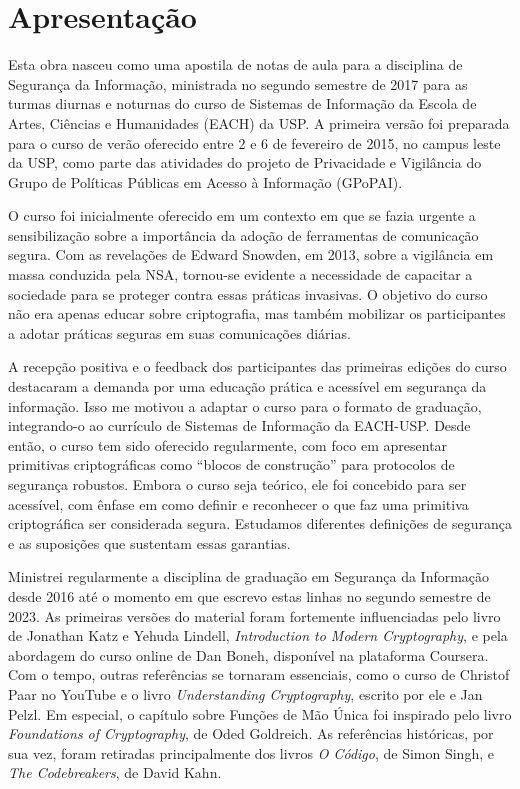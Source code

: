 ﻿\chapter*{Apresentação}

Esta obra nasceu como uma apostila de notas de aula para a disciplina de Segurança da Informação, ministrada no segundo semestre de 2017 para as turmas diurnas e noturnas do curso de Sistemas de Informação da Escola de Artes, Ciências e Humanidades (EACH) da USP.
A primeira versão foi preparada para o curso de verão oferecido entre 2 e 6 de fevereiro de 2015, no campus leste da USP, como parte das atividades do projeto de Privacidade e Vigilância do Grupo de Políticas Públicas em Acesso à Informação (GPoPAI).

O curso foi inicialmente oferecido em um contexto em que se fazia urgente a sensibilização sobre a importância da adoção de ferramentas de comunicação segura.
Com as revelações de Edward Snowden, em 2013, sobre a vigilância em massa conduzida pela NSA, tornou-se evidente a necessidade de capacitar a sociedade para se proteger contra essas práticas invasivas. O objetivo do curso não era apenas educar sobre criptografia, mas também mobilizar os participantes a adotar práticas seguras em suas comunicações diárias.

A recepção positiva e o feedback dos participantes das primeiras edições do curso destacaram a demanda por uma educação prática e acessível em segurança da informação. Isso me motivou a adaptar o curso para o formato de graduação, integrando-o ao currículo de Sistemas de Informação da EACH-USP.
Desde então, o curso tem sido oferecido regularmente, com foco em apresentar primitivas criptográficas como ``blocos de construção'' para protocolos de segurança robustos.
Embora o curso seja teórico, ele foi concebido para ser acessível, com ênfase em como definir e reconhecer o que faz uma primitiva criptográfica ser considerada segura.
Estudamos diferentes definições de segurança e as suposições que sustentam essas garantias.

Ministrei regularmente a disciplina de graduação em Segurança da Informação desde 2016 até o momento em que escrevo estas linhas no segundo semestre de 2023.
As primeiras versões do material foram fortemente influenciadas pelo livro de Jonathan Katz e Yehuda Lindell, {\em Introduction to Modern Cryptography}, e pela abordagem do curso online de Dan Boneh, disponível na plataforma Coursera.
Com o tempo, outras referências se tornaram essenciais, como o curso de Christof Paar no YouTube e o livro {\em Understanding Cryptography}, escrito por ele e Jan Pelzl.
Em especial, o capítulo sobre Funções de Mão Única foi inspirado pelo livro {\em Foundations of Cryptography}, de Oded Goldreich.
As referências históricas, por sua vez, foram retiradas principalmente dos livros {\em O Código}, de Simon Singh, e {\em The Codebreakers}, de David Kahn.

